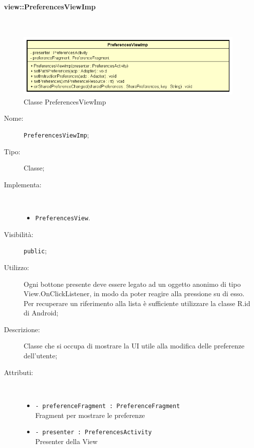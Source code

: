 \documentclass[../DefinizioneDiProdotto.tex]{subfiles}
\begin{document}
\paragraph{view::PreferencesViewImp}
\
\begin{figure}[H]
	\centering
	\includegraphics[width=\maxwidth]{img/PreferencesViewImp.png}
	\caption{Classe PreferencesViewImp}\label{fig:view::PreferencesViewImp} 
\end{figure}
\begin{description}
	\item[Nome:] \texttt{PreferencesViewImp};
	\item[Tipo:] Classe;
	\item[Implementa:] \
	\begin{itemize}
		\item \texttt{PreferencesView}.
		
	\end{itemize}
	\item[Visibilità:] \texttt{public};
	\item[Utilizzo:] Ogni bottone presente deve essere legato ad un oggetto anonimo di tipo View.OnClickListener, in modo da poter reagire alla pressione su di esso. Per recuperare un riferimento alla lista è sufficiente utilizzare la classe R.id di Android;
	\item[Descrizione:] Classe che si occupa di mostrare la UI utile alla modifica delle preferenze dell'utente;
	\item[Attributi:] \
	\begin{itemize}
		\item \texttt{- preferenceFragment : PreferenceFragment}\\
		Fragment per mostrare le preferenze
		
		\item \texttt{- presenter : PreferencesActivity}\\
		Presenter della View
		

\end{itemize}
\end{description}
\end{document}
